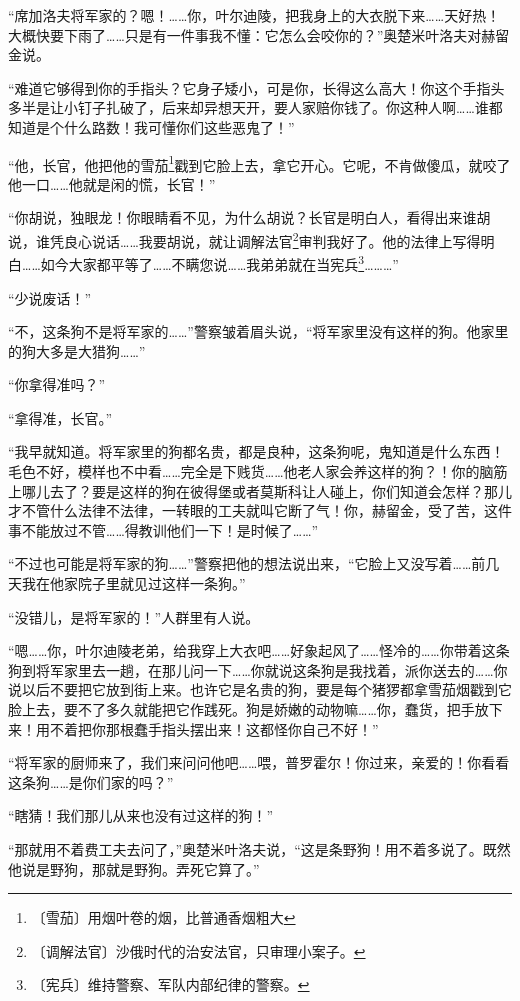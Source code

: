 \documentclass[12pt,UTF-8,openany]{ctexbook}
\begin{document}
\begin{large}
    “席加洛夫将军家的？嗯！……你，叶尔迪陵，把我身上的大衣脱下来……天好热！大概快要下雨了……只是有一件事我不懂：它怎么会咬你的？”奥楚米叶洛夫对赫留金说。
    
    “难道它够得到你的手指头？它身子矮小，可是你，长得这么高大！你这个手指头多半是让小钉子扎破了，后来却异想天开，要人家赔你钱了。你这种人啊……谁都知道是个什么路数！我可懂你们这些恶鬼了！”
    
    “他，长官，他把他的雪茄\footnote{〔雪茄〕用烟叶卷的烟，比普通香烟粗大}戳到它脸上去，拿它开心。它呢，不肯做傻瓜，就咬了他一口……他就是闲的慌，长官！”
    
    “你胡说，独眼龙！你眼睛看不见，为什么胡说？长官是明白人，看得出来谁胡说，谁凭良心说话……我要胡说，就让调解法官\footnote{〔调解法官〕沙俄时代的治安法官，只审理小案子。}审判我好了。他的法律上写得明白……如今大家都平等了……不瞒您说……我弟弟就在当宪兵\footnote{〔宪兵〕维持警察、军队内部纪律的警察。}………”
    
    “少说废话！”
    
    “不，这条狗不是将军家的……”警察皱着眉头说，“将军家里没有这样的狗。他家里的狗大多是大猎狗……”
    
    “你拿得准吗？”
    
    “拿得准，长官。”
    
    “我早就知道。将军家里的狗都名贵，都是良种，这条狗呢，鬼知道是什么东西！毛色不好，模样也不中看……完全是下贱货……他老人家会养这样的狗？！你的脑筋上哪儿去了？要是这样的狗在彼得堡或者莫斯科让人碰上，你们知道会怎样？那儿才不管什么法律不法律，一转眼的工夫就叫它断了气！你，赫留金，受了苦，这件事不能放过不管……得教训他们一下！是时候了……”
    
    “不过也可能是将军家的狗……”警察把他的想法说出来，“它脸上又没写着……前几天我在他家院子里就见过这样一条狗。”
    
    “没错儿，是将军家的！”人群里有人说。
    
    “嗯……你，叶尔迪陵老弟，给我穿上大衣吧……好象起风了……怪冷的……你带着这条狗到将军家里去一趟，在那儿问一下……你就说这条狗是我找着，派你送去的……你说以后不要把它放到街上来。也许它是名贵的狗，要是每个猪猡都拿雪茄烟戳到它脸上去，要不了多久就能把它作践死。狗是娇嫩的动物嘛……你，蠢货，把手放下来！用不着把你那根蠢手指头摆出来！这都怪你自己不好！”
    
    “将军家的厨师来了，我们来问问他吧……喂，普罗霍尔！你过来，亲爱的！你看看这条狗……是你们家的吗？”
    
    “瞎猜！我们那儿从来也没有过这样的狗！”
    
    “那就用不着费工夫去问了，”奥楚米叶洛夫说，“这是条野狗！用不着多说了。既然他说是野狗，那就是野狗。弄死它算了。”
    

\end{large}
\end{document}
